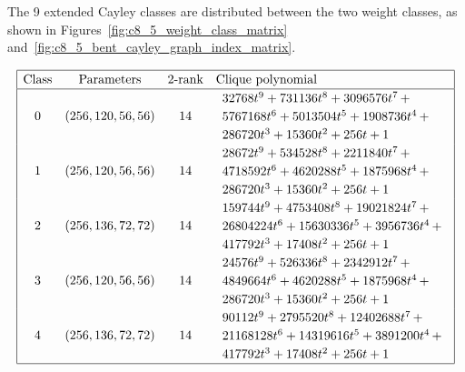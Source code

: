 \documentclass[12pt,a4paper]{article}
\begin{document}
The 9 extended Cayley classes are distributed between the two weight classes,
as shown in Figures~\ref{fig:c8_5_weight_class_matrix} and~\ref{fig:c8_5_bent_cayley_graph_index_matrix}.
\begin{table}[!bhpt] %
%
\small{}
\begin{align*}
\def\arraystretch{1.2}
\begin{array}{|cccl|}
\hline
\text{Class} &
\text{Parameters} &
\text{2-rank} &
\text{Clique polynomial}
\\
\hline
0 &
(256, 120, 56, 56) &
14 &
\begin{array}{l}
32768t^{9} + 731136t^{8} + 3096576t^{7}
\,+
\\
 5767168t^{6} + 5013504t^{5} + 1908736t^{4}
\,+
\\
 286720t^{3} + 15360t^{2} + 256t + 1
\end{array}
\\
1 &
(256, 120, 56, 56) &
14 &
\begin{array}{l}
28672t^{9} + 534528t^{8} + 2211840t^{7}
\,+
\\
 4718592t^{6} + 4620288t^{5} + 1875968t^{4}
\,+
\\
 286720t^{3} + 15360t^{2} + 256t + 1
\end{array}
\\
2 &
(256, 136, 72, 72) &
14 &
\begin{array}{l}
159744t^{9} + 4753408t^{8} + 19021824t^{7}
\,+
\\
 26804224t^{6} + 15630336t^{5} + 3956736t^{4}
\,+
\\
 417792t^{3} + 17408t^{2} + 256t + 1
\end{array}
\\
3 &
(256, 120, 56, 56) &
14 &
\begin{array}{l}
24576t^{9} + 526336t^{8} + 2342912t^{7}
\,+
\\
 4849664t^{6} + 4620288t^{5} + 1875968t^{4}
\,+
\\
 286720t^{3} + 15360t^{2} + 256t + 1
\end{array}
\\
4 &
(256, 136, 72, 72) &
14 &
\begin{array}{l}
90112t^{9} + 2795520t^{8} + 12402688t^{7}
\,+
\\
 21168128t^{6} + 14319616t^{5} + 3891200t^{4}
\,+
\\
 417792t^{3} + 17408t^{2} + 256t + 1
\end{array}
\\
\hline
\end{array}
\end{align*}
\caption{$[f_{8,5}]$ extended Cayley classes (part 1).}
\label{tab-c8_5_EC_classes}
\end{table}
\end{document}
